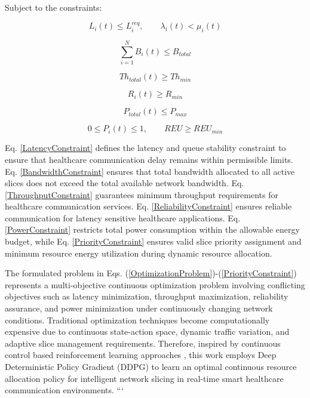 \documentclass[10pt,journal,compsoc]{IEEEtran}
\begin{document}
Subject to the constraints:

\begin{equation}\label{LatencyConstraint}
L_i(t)\leq L_i^{req}, \qquad \lambda_i(t)<\mu_i(t)
\end{equation}

\begin{equation}\label{BandwidthConstraint}
\sum_{i=1}^{N}B_i(t)\leq B_{total}
\end{equation}

\begin{equation}\label{ThroughputConstraint}
Th_{total}(t)\geq Th_{min}
\end{equation}

\begin{equation}\label{ReliabilityConstraint}
R_i(t)\geq R_{min}
\end{equation}

\begin{equation}\label{PowerConstraint}
P_{total}(t)\leq P_{max}
\end{equation}

\begin{equation}\label{PriorityConstraint}
0\leq P_i(t)\leq1, \qquad REU\geq REU_{min}
\end{equation}

Eq. \eqref{LatencyConstraint} defines the latency and queue stability constraint to ensure that healthcare communication delay remains within permissible limits. Eq. \eqref{BandwidthConstraint} ensures that total bandwidth allocated to all active slices does not exceed the total available network bandwidth. Eq. \eqref{ThroughputConstraint} guarantees minimum throughput requirements for healthcare communication services. Eq. \eqref{ReliabilityConstraint} ensures reliable communication for latency sensitive healthcare applications. Eq. \eqref{PowerConstraint} restricts total power consumption within the allowable energy budget, while Eq. \eqref{PriorityConstraint} ensures valid slice priority assignment and minimum resource energy utilization during dynamic resource allocation.

The formulated problem in Eqs. (\ref{OptimizationProblem})-(\ref{PriorityConstraint}) represents a multi-objective continuous optimization problem involving conflicting objectives such as latency minimization, throughput maximization, reliability assurance, and power minimization under continuously changing network conditions. Traditional optimization techniques become computationally expensive due to continuous state-action space, dynamic traffic variation, and adaptive slice management requirements. Therefore, inspired by continuous control based reinforcement learning approaches \cite{saleh2025hybridrl,tariq2025ddpgv2x,kumar2025lstmddpg}, this work employs Deep Deterministic Policy Gradient (DDPG) to learn an optimal continuous resource allocation policy for intelligent network slicing in real-time smart healthcare communication environments.
```
\end{document}
